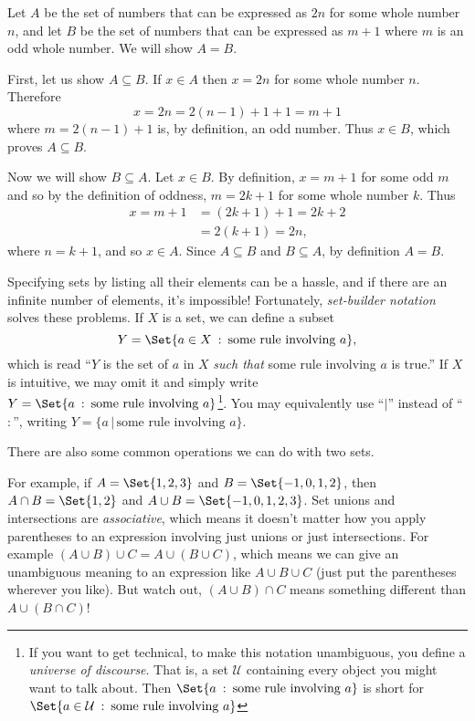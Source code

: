 \begin{example}
	Let $A$ be the set of numbers that can be expressed
	as $2n$ for some whole number $n$, and let $B$ be the
	set of numbers that can be expressed as $m+1$ where $m$ is
	an odd whole number.  We will show $A=B$.

	First, let us show $A\subseteq B$.  If $x\in A$ then $x=2n$
	for some whole number $n$.  Therefore 
	\[x=2n=2(n-1)+1+1=m+1\] where
	$m=2(n-1)+1$ is, by definition, an odd number.  Thus $x\in B$,
	which proves $A\subseteq B$.

	Now we will show $B\subseteq A$.  Let $x\in B$.  By definition,
	$x=m+1$ for some odd $m$ and so by the definition of oddness, $m=2k+1$
	for some whole number $k$.  Thus 
	\begin{align*}
		x=m+1&=(2k+1)+1=2k+2\\
		&=2(k+1)=2n,
	\end{align*} where $n=k+1$, and so $x\in A$.  Since $A\subseteq B$
	and $B\subseteq A$, by definition $A=B$.
\end{example}


Specifying sets by listing all their elements can be a hassle, and if there are an infinite
number of elements, it's impossible!  Fortunately, \emph{set-builder notation}
solves these problems.
If $X$ is a set, we can define a subset 
\[
	Y= \Set{a\in X\given\text{some rule involving }a},
\]
which is read ``$Y$ is the set of $a$ in $X$ \emph{such that} some rule
involving $a$ is true.''  If $X$ is intuitive, we may omit it and
simply write $Y=\Set{a\given\text{some rule involving }a}$\footnote{ If you want
to get technical, to make this notation unambiguous, you define a 
\emph{universe of discourse}.  That is, a set $\mathcal U$ containing
every object you might want to talk about.  Then $\Set{a\given\text{some rule involving }a}$
is short for $\Set{a\in\mathcal U\given\text{some rule involving }a}$}.  You may equivalently
use ``$|$'' instead of ``$:$'', writing $Y=\{a\,|\,\text{some rule involving }a\}$.

There are also some common operations we can do with two sets.

For example, if $A=\Set{1,2,3}$ and $B=\Set{-1,0,1,2}$, then $A\cap B=\Set{1,2}$ and $A\cup B=
\Set{-1,0,1,2,3}$.  Set unions and intersections are \emph{associative}, which means it doesn't
matter how you apply parentheses to an expression involving just unions or just intersections.
For example $(A\cup B)\cup C=A\cup(B\cup C)$, which means
we can give an unambiguous meaning to an expression like $A\cup B\cup C$ (just put
the parentheses wherever you like).  But watch out, $(A\cup B)\cap C$ means something
different than $A\cup(B\cap C)$!

